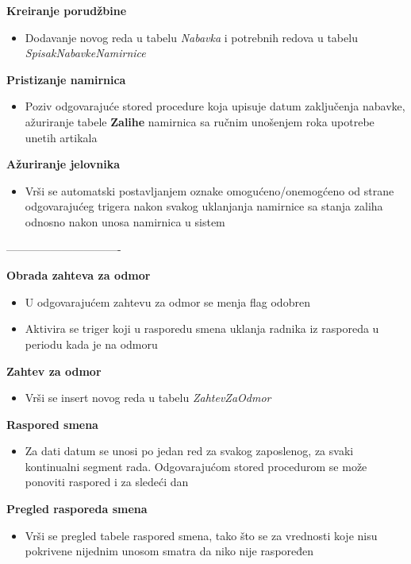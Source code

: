 \documentclass{article}
\begin{document}
\textbf{Kreiranje porudžbine}
\begin{itemize}
\item Dodavanje novog reda u tabelu \emph{Nabavka} i potrebnih redova u tabelu \emph{SpisakNabavkeNamirnice}
\end{itemize}

\textbf{Pristizanje namirnica}
\begin{itemize}
\item Poziv odgovarajuće stored procedure koja upisuje datum zaključenja nabavke, ažuriranje tabele \textbf{Zalihe} namirnica sa ručnim unošenjem roka upotrebe unetih artikala 
\end{itemize}

\textbf{Ažuriranje jelovnika}
\begin{itemize}
\item Vrši se automatski postavljanjem oznake omogućeno/onemogćeno od strane odgovarajućeg trigera nakon svakog uklanjanja namirnice sa stanja zaliha odnosno nakon unosa namirnica u sistem
\end{itemize}


-------------------------------

\textbf{Obrada zahteva za odmor}
\begin{itemize}
\item U odgovarajućem zahtevu za odmor se menja flag odobren
\item Aktivira se triger koji u rasporedu smena uklanja radnika iz rasporeda u periodu kada je na odmoru
\end{itemize}

\textbf{Zahtev za odmor}
\begin{itemize}
\item Vrši se insert novog reda u tabelu \emph{ZahtevZaOdmor} 
\end{itemize}

\textbf{Raspored smena}
\begin{itemize}
\item Za dati datum se unosi po jedan red za svakog zaposlenog, za svaki kontinualni segment rada. Odgovarajućom stored procedurom se može ponoviti raspored i za sledeći dan
\end{itemize}

\textbf{Pregled rasporeda smena}
\begin{itemize}
\item Vrši se pregled tabele raspored smena, tako što se za vrednosti koje nisu pokrivene nijednim unosom smatra da niko nije raspoređen
\end{itemize}
\end{document}
